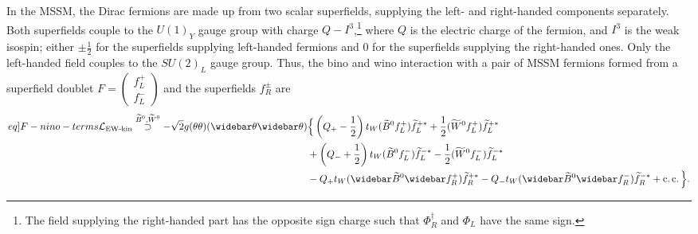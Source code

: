 \documentclass[english, notitlepage]{article}
\begin{document}
            In the MSSM, the Dirac fermions are made up from two scalar superfields,
            supplying the left- and right-handed components separately. Both superfields
            couple to the ${U(1)}_Y$ gauge group with charge $Q-I^3$,\footnote{The field
                supplying the right-handed part has the opposite sign charge such that
                $\Phi^\dag_R$ and $\Phi_L$ have the same sign.} where $Q$ is the electric
            charge of the fermion, and $I^3$ is the weak isospin; either $\pm \frac{1}{2}$
            for the superfields supplying left-handed fermions and 0 for the superfields
            supplying the right-handed ones. Only the left-handed field couples to the
            ${SU(2)}_L$ gauge group. Thus, the bino and wino interaction with a pair of
            MSSM fermions formed from a superfield doublet $F = \begin{pmatrix} f_L^+ \\ f_L^- \end{pmatrix}$ and the superfields $f_R^\pm$ are
            \begin{align}  \label[eq]{F-nino-terms} \nonumber
                \L_{\text{EW-kin}} \stackrel{\bino, \wino}{\supset} -\sqrt{2} g (\theta\theta)(\wbar\theta\wbar\theta) & \Big\{ \pclosed{Q_+-\frac{1}{2}}t_W (\bino f_L^+) \wtilde{f}_L^{+*} + \frac{1}{2} (\wino f_L^+) \wtilde{f}_L^{+*}                     \\ \nonumber
                                                                                                                       & + \pclosed{Q_-+\frac{1}{2}}t_W (\bino f_L^-)\wtilde{f}_L^{-*} - \frac{1}{2} (\wino f_L^-)\wtilde{f}_L^{-*}                            \\
                                                                                                                       & - Q_+t_W (\wbar{\wtilde{B}}^0\wbar{f}_R^+)\wtilde{f}_R^{+*} - Q_-t_W (\wbar{\wtilde{B}}^0\wbar{f}_R^-)\wtilde{f}_R^{-*} + \cc \Big\}.
            \end{align}
\end{document}
